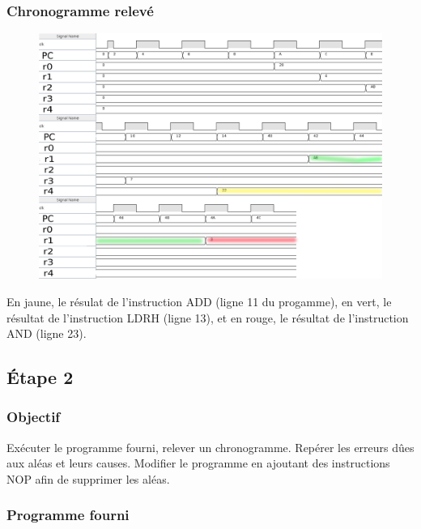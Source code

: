 \documentclass[a4paper]{article} %
\begin{document}
\subsubsection{Chronogramme relevé}
\begin{figure}[H]
    \centering
    \includegraphics[width=.8\textwidth]{src/CHRONO_ET1_COL2.png}
    \label{fig:chrono_et1_pic}
\end{figure}
En jaune, le résulat de l'instruction ADD (ligne 11 du progamme), en vert, le résultat de l'instruction LDRH (ligne 13), et en rouge, le résultat de l'instruction AND (ligne 23).
\subsection{Étape 2}
\subsubsection{Objectif}
Exécuter le programme fourni, relever un chronogramme. Repérer les erreurs dûes aux aléas et leurs causes. Modifier le programme en ajoutant des instructions NOP afin de supprimer les aléas.
\subsubsection{Programme fourni}

\end{document}
